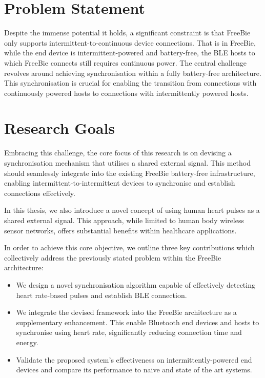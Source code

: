 \section{Problem Statement}
Despite the immense potential it holds, a significant constraint is that FreeBie only supports intermittent-to-continuous device connections. That is in FreeBie, while the end device is intermittent-powered and battery-free, the BLE hosts to which FreeBie connects still requires continuous power. The central challenge revolves around achieving synchronisation within a fully battery-free architecture. This synchronisation is crucial for enabling the transition from connections with continuously powered hosts to connections with intermittently powered hosts.

\section{Research Goals}
Embracing this challenge, the core focus of this research is on devising a synchronisation mechanism that utilises a shared external signal. This method should seamlessly integrate into the existing FreeBie battery-free infrastructure, enabling intermittent-to-intermittent devices to synchronise and establish connections effectively.
\vspace{1\baselineskip}

\noindent In this thesis, we also introduce a novel concept of using human heart pulses as a shared external signal. This approach, while limited to human body wireless sensor networks, offers substantial benefits within healthcare applications.
\vspace{1\baselineskip}

\noindent In order to achieve this core objective, we outline three key contributions which collectively address the previously stated problem within the FreeBie architecture:

\begin{itemize}
    \item We design a novel synchronisation algorithm capable of effectively detecting heart rate-based pulses and establish BLE connection.
    
    \item We integrate the devised framework into the FreeBie architecture as a supplementary enhancement. This enable Bluetooth end devices and hosts to synchronise using heart rate, significantly reducing connection time and energy.
    
    \item Validate the proposed system's effectiveness on intermittently-powered end devices and compare its performance to naive and state of the art systems.
\end{itemize}
\vspace{8\baselineskip}

